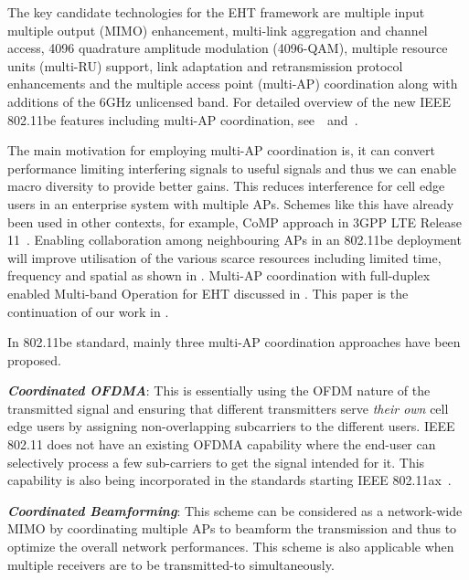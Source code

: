 The key candidate technologies for the EHT framework are  multiple input multiple output (MIMO) enhancement, multi-link aggregation and channel access, 4096 quadrature amplitude modulation (4096-QAM), multiple resource units (multi-RU) support, link adaptation and retransmission protocol enhancements and the multiple access point (multi-AP) coordination \cite{wifi7currentstatus} along with additions of the 6GHz unlicensed band. For detailed overview of the new IEEE 802.11be features including multi-AP coordination, see~\cite{wifi7challenges}~and~\cite{wifi7currentstatus}.

The main motivation for employing multi-AP coordination is, it can convert performance limiting interfering signals to useful signals and thus we can enable macro diversity to provide better gains. This reduces interference for cell edge users in an enterprise system with multiple APs. Schemes like this have already been used in other contexts, for example, CoMP approach in 3GPP LTE Release 11~\cite{LTEcomp}. Enabling collaboration among neighbouring APs in an 802.11be deployment will improve utilisation of the various scarce resources including limited time, frequency and spatial as shown in \cite{JT_decision}. 
Multi-AP coordination with full-duplex enabled Multi-band Operation for EHT discussed in \cite{multi_band}. 
This paper is the continuation of our work in \cite{JT_decision}.

In 802.11be standard, mainly three multi-AP coordination approaches have been proposed.

\noindent\textit{\textbf{Coordinated OFDMA}}: This is essentially using the OFDM nature of the transmitted signal and ensuring that different transmitters serve \emph{their own} cell edge users by assigning non-overlapping subcarriers to the different users. IEEE 802.11 does not have an existing OFDMA capability where the end-user can selectively process a few sub-carriers to get the signal intended for it. This capability is also being incorporated in the standards starting IEEE 802.11ax~\cite{Bellalta80211ax}. 

\noindent\textit{\textbf{Coordinated Beamforming}}: This scheme can be considered as a network-wide MIMO by coordinating multiple APs to beamform the transmission and thus to optimize the overall network performances.  This scheme is also applicable when multiple receivers are to be transmitted-to simultaneously.

